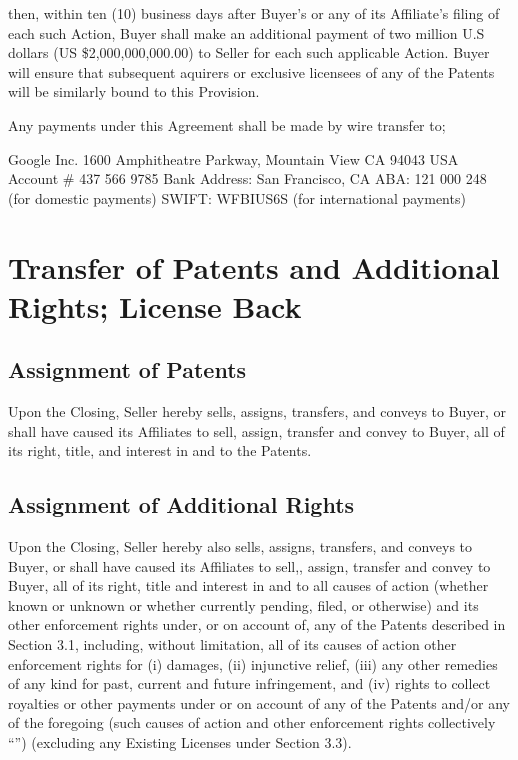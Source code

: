 \documentclass[letterpaper,10pt,openany,oneside,english]{sphinxmanual}
\begin{document}
then, within ten (10) business days after Buyer’s or any of its Affiliate’s filing of each such Action, Buyer shall make an additional payment of two million U.S dollars (US \$2,000,000,000.00) to Seller for each such applicable Action. Buyer will ensure that subsequent aquirers or exclusive licensees of any of the Patents will be similarly bound to this Provision.

Any payments under this Agreement shall be made by wire transfer to;

Google Inc.
1600 Amphitheatre Parkway, Mountain View CA 94043 USA
Account \# 437 566 9785
Bank Address: San Francisco, CA
ABA: 121 000 248 (for domestic payments)
SWIFT: WFBIUS6S (for international payments)


\section{Transfer of Patents and Additional Rights; License Back}
\label{\detokenize{3-transfer:transfer-of-patents-and-additional-rights-license-back}}\label{\detokenize{3-transfer::doc}}

\subsection{Assignment of Patents}
\label{\detokenize{3-transfer:assignment-of-patents}}
Upon the Closing, Seller hereby sells, assigns, transfers, and conveys to Buyer, or shall have caused its Affiliates to sell, assign, transfer and convey to Buyer, all of its right, title, and interest in and to the Patents.


\subsection{Assignment of Additional Rights}
\label{\detokenize{3-transfer:assignment-of-additional-rights}}
Upon the Closing, Seller hereby also sells, assigns, transfers, and conveys to Buyer, or shall have caused its Affiliates to sell,, assign, transfer and convey to Buyer, all of its right, title and interest in and to all causes of action (whether known or unknown or whether currently pending, filed, or otherwise) and its other enforcement rights under, or on account of, any of the Patents described in Section 3.1, including, without limitation, all of its causes of action other enforcement rights for (i) damages, (ii) injunctive relief, (iii) any other remedies of any kind for past, current and future infringement, and (iv) rights to collect royalties or other payments under or on account of any of the Patents and/or any of the foregoing (such causes of action and other enforcement rights collectively “”) (excluding any Existing Licenses under Section 3.3).
\end{document}
